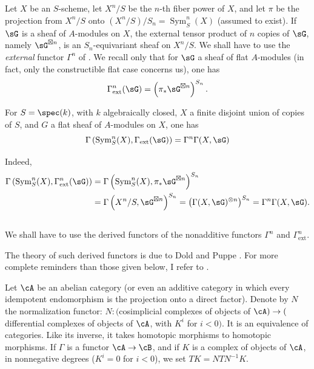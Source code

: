 \documentclass[oneside]{book}
\begin{document}
\subsection{}\label{III:1-2}

Let $X$ be an $S$-scheme, let $X^n/S$ be the $n$-th fiber power of $X$, and
let $\pi$ be the projection from $X^n/S$ onto
$(X^n/S)/S_n=\operatorname{Sym}_S^n(X)$ (assumed to exist). If $\sG$ is a
sheaf of $A$-modules on $X$, the external tensor product of $n$ copies of
$\sG$, namely $\sG^{\boxtimes n}$, is an $S_n$-equivariant sheaf on $X^n/S$.
We shall have to use the \emph{external} functor $\Gamma^n$ of
\cite[XVII 5.5.7 to 9]{sga4}. We recall only that for $\sG$ a sheaf of flat
$A$-modules (in fact, only the constructible flat case concerns us), one has
\[
  \Gamma_\text{ext}^n(\sG) = \left(\pi_*\sG^{\boxtimes n}\right)^{S_n} \text{.}
\]






\begin{lemma_}\label{III:1-3}
For $S=\spec(k)$, with $k$ algebraically closed, $X$ a finite disjoint union of
copies of $S$, and $G$ a flat sheaf of $A$-modules on $X$, one has
\[
  \Gamma\left(\operatorname{Sym}_S^n(X),\Gamma_\text{ext}(\sG)\right) = \Gamma^n \Gamma(X,\sG)
\]
\end{lemma_}

Indeed,
\begin{align*}
  \Gamma\left(\operatorname{Sym}_S^n(X),\Gamma_\text{ext}^n(\sG)\right)
    &= \Gamma\left(\operatorname{Sym}_S^n(X),\pi_*\sG^{\boxtimes n}\right)^{S_n} \\
    &= \Gamma\left(X^n/S,\sG^{\boxtimes n}\right)^{S_n}
    = \left(\Gamma(X,\sG)^{\otimes n}\right)^{S_n}
    = \Gamma^n \Gamma(X,\sG) \text{.}
\end{align*}






\subsection{}\label{III:1-4}

We shall have to use the derived functors of the nonadditive functors
$\Gamma^n$ and $\Gamma_\text{ext}^n$.

The theory of such derived functors is due to Dold and Puppe
\cite{do61}. For more complete reminders than those given below, I refer to
\cite[XVII 5.5.3]{sga4}.

Let $\cA$ be an abelian category (or even an additive category in which every
idempotent endomorphism is the projection onto a direct factor). Denote by $N$
the normalization functor: $N:($cosimplicial complexes of objects of
$\cA)\to($differential complexes of objects of $\cA$, with $K^i$ for
$i<0)$. It is an equivalence of categories. Like its inverse, it takes
homotopic morphisms to homotopic morphisms. If $\Gamma$ is a functor
$\cA\to\cB$, and if $K$ is a complex of objects of $\cA$, in nonnegative
degrees ($K^i=0$ for $i<0$), we set $T K=N T N^{-1} K$.
\end{document}
